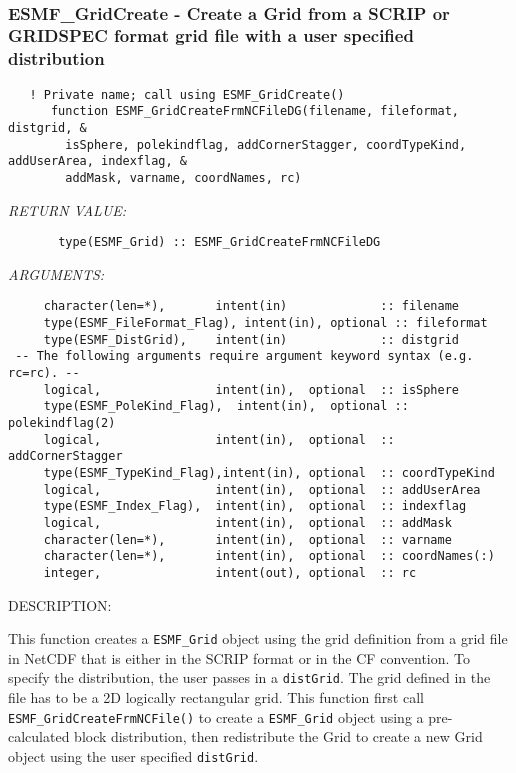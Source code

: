  
\mbox{}\hrulefill\ 
 
\subsubsection [ESMF\_GridCreate] {ESMF\_GridCreate - Create a Grid from a SCRIP or GRIDSPEC format grid file with a user specified distribution}


 
\begin{verbatim}   ! Private name; call using ESMF_GridCreate()
      function ESMF_GridCreateFrmNCFileDG(filename, fileformat, distgrid, &
        isSphere, polekindflag, addCornerStagger, coordTypeKind, addUserArea, indexflag, &
        addMask, varname, coordNames, rc)
 \end{verbatim}{\em RETURN VALUE:}
\begin{verbatim}       type(ESMF_Grid) :: ESMF_GridCreateFrmNCFileDG\end{verbatim}{\em ARGUMENTS:}
\begin{verbatim} 
     character(len=*),       intent(in)             :: filename
     type(ESMF_FileFormat_Flag), intent(in), optional :: fileformat
     type(ESMF_DistGrid),    intent(in)             :: distgrid
 -- The following arguments require argument keyword syntax (e.g. rc=rc). --
     logical,                intent(in),  optional  :: isSphere
     type(ESMF_PoleKind_Flag),  intent(in),  optional :: polekindflag(2)
     logical,                intent(in),  optional  :: addCornerStagger
     type(ESMF_TypeKind_Flag),intent(in), optional  :: coordTypeKind
     logical,                intent(in),  optional  :: addUserArea
     type(ESMF_Index_Flag),  intent(in),  optional  :: indexflag
     logical,                intent(in),  optional  :: addMask
     character(len=*),       intent(in),  optional  :: varname
     character(len=*),       intent(in),  optional  :: coordNames(:)
     integer,                intent(out), optional  :: rc
 \end{verbatim}
{\sf DESCRIPTION:\\ }


   This function creates a {\tt ESMF\_Grid} object using the grid definition from
   a grid file in NetCDF that is either in the SCRIP format or in the CF convention.
   To specify the distribution, the user passes in a {\tt distGrid}.
   The grid defined in the file has to be a 2D logically rectangular grid.
   This function first call {\tt ESMF\_GridCreateFrmNCFile()} to create a {\tt ESMF\_Grid}
   object using a pre-calculated block distribution, then redistribute the Grid to
   create a new Grid object using the user specified {\tt distGrid}.
  
